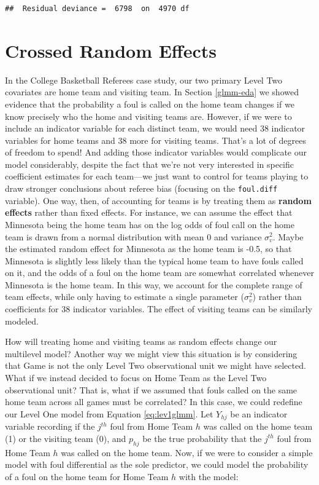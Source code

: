 \documentclass[
]{krantz}
\begin{document}
\begin{verbatim}
##  Residual deviance =  6798  on  4970 df
\end{verbatim}

\hypertarget{crossedre}{%
\section{Crossed Random Effects}\label{crossedre}}

In the College Basketball Referees case study, our two primary Level Two covariates are home team and visiting team. In Section \ref{glmm-eda} we showed evidence that the probability a foul is called on the home team changes if we know precisely who the home and visiting teams are. However, if we were to include an indicator variable for each distinct team, we would need 38 indicator variables for home teams and 38 more for visiting teams. That's a lot of degrees of freedom to spend! And adding those indicator variables would complicate our model considerably, despite the fact that we're not very interested in specific coefficient estimates for each team---we just want to control for teams playing to draw stronger conclusions about referee bias (focusing on the \texttt{foul.diff} variable). One way, then, of accounting for teams is by treating them as \textbf{random effects} rather than fixed effects. For instance, we can assume the effect that Minnesota being the home team has on the log odds of foul call on the home team is drawn from a normal distribution with mean 0 and variance \(\sigma^{2}_{v}\). Maybe the estimated random effect for Minnesota as the home team is -0.5, so that Minnesota is slightly less likely than the typical home team to have fouls called on it, and the odds of a foul on the home team are somewhat correlated whenever Minnesota is the home team. In this way, we account for the complete range of team effects, while only having to estimate a single parameter (\(\sigma^{2}_{v}\)) rather than coefficients for 38 indicator variables. The effect of visiting teams can be similarly modeled.

How will treating home and visiting teams as random effects change our multilevel model? Another way we might view this situation is by considering that Game is not the only Level Two observational unit we might have selected. What if we instead decided to focus on Home Team as the Level Two observational unit? That is, what if we assumed that fouls called on the same home team across all games must be correlated? In this case, we could redefine our Level One model from Equation \eqref{eq:lev1glmm}. Let \(Y_{hj}\) be an indicator variable recording if the \(j^{th}\) foul from Home Team \(h\) was called on the home team (1) or the visiting team (0), and \(p_{hj}\) be the true probability that the \(j^{th}\) foul from Home Team \(h\) was called on the home team. Now, if we were to consider a simple model with foul differential as the sole predictor, we could model the probability of a foul on the home team for Home Team \(h\) with the model:
\end{document}

